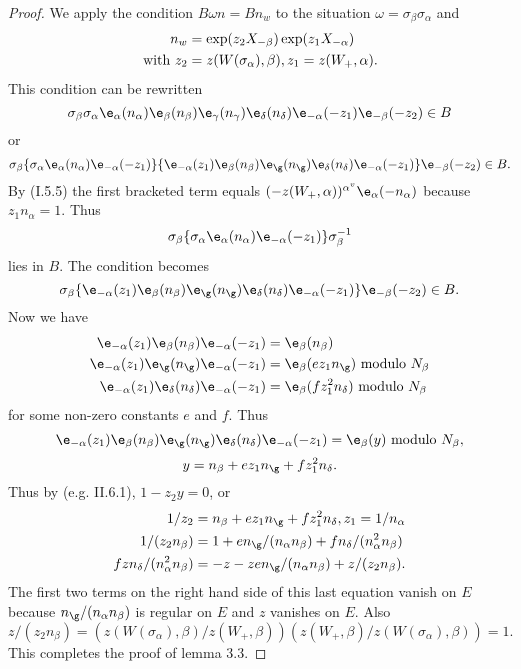 \documentclass{memo-l}
\theoremstyle{definition}
\theoremstyle{remark}
\numberwithin{section}{chapter}
\numberwithin{equation}{chapter}
\begin{document}
\begin{proof}    We apply the condition $B{\omega}n = Bn_{w}$ to the situation
${\omega} = {\sigma}_{\beta}{\sigma}_{\alpha}$ and
$$
\aligned
n_{w} &= \exp(z_{2}X_{-{\beta}})\exp(z_{1}X_{-{\alpha}}) \\
{\text{with}}\ z_{2} &= z(W({\sigma}_{\alpha}),{\beta}),
z_{1} = z(W_{+},{\alpha}).
\endaligned
$$
This condition can be rewritten
$$
{\sigma}_{\beta}{\sigma}_{\alpha}{\e}_{\alpha}(n_{\alpha})
{\e_\beta}(n_\beta)\e_\gamma(n_\gamma)\e_\delta(n_\delta)\e_{-\alpha}
(-z_{1}){\e}_{-{\beta}}(-z_{2}) \in B
$$
or
$$
\sigma_\beta
\{       \sigma_\alpha\e_\alpha(n_\alpha) \e_{-\alpha}(-z_{1})  \}
\{       \e_{-\alpha}(z_1)\e_\beta (n_\beta){\e}_\g(n_\g)\e_\delta (n_\delta)\e_{-\alpha}(-z_1)   \}
\e_{-\beta}(-z_2)
\in B .
$$
By (I.5.5) the first bracketed term equals $(-z(W_{+},{\alpha}))^{\alpha^v}
{\e}_{\alpha}(-n_{\alpha})$ because
$z_{1}n_{\alpha} = 1$.
 Thus $${\sigma}_{\beta}\{{\sigma}_{\alpha}{\e}_{\alpha}
(n_{\alpha}){\e}_{-{\alpha}}(-z_{1})\}{\sigma}_{\beta}^{-1}$$ lies
in $B$.
 The condition becomes
$$
{\sigma}_{\beta}\{{\e}_{-{\alpha}}(z_{1}){\e}_{\beta}
(n_{\beta}){\e}_{{\g}}(n_{{\g}}){\e}_{{\delta}}
(n_{{\delta}}){\e}_{{-\alpha}}(-z_{1})\}{\e}_{-{\beta}}(-z_{2})
\in B.
$$
 Now we have
$$
\aligned
{\e}_{-{\alpha}}(z_{1}){\e}_{\beta}(n_{\beta})
{\e}_{-{\alpha}}(-z_{1}) &= {\e}_{\beta}(n_{\beta})\\
{\e}_{-{\alpha}}(z_{1}){\e}_{{\g}}(n_{{\g}})
{\e}_{-{\alpha}}(-z_{1}) &= {\e}_{\beta}(ez_{1}n_{{\g}})\
{\text{modulo}}\ N_{\beta} \\
{\e}_{-{\alpha}}(z_{1}){\e}_{{\delta}}(n_{{\delta}})
{\e}_{-{\alpha}}(-z_{1}) &= {\e}_{\beta}(fz_{1}^{2}n_{{\delta}})\
{\text{modulo}}\  N_{\beta}
\endaligned
$$
for some non-zero constants $e$ and $f$.  Thus
$$
{\e}_{-{\alpha}}(z_{1}){\e}_{\beta}(n_{\beta})
{\e}_{{\g}}(n_\g)\e_\delta(n_\delta)\e_{-\alpha}(-z_{1}) = {\e}_{\beta}(y)\
{\text{modulo}}\  N_{\beta} ,
$$
$$
y = n_{\beta} + ez_{1}n_{{\g}} + fz_{1}^{2}n_{{\delta}}.
$$
Thus by (e.g. II.6.1), $1-z_{2}y = 0$, or
$$
\aligned
1/z_{2} &= n_{\beta} + ez_{1}n_{{\g}} + fz_{1}^{2}n_{{\delta}},
z_{1}=1/n_{\alpha} \\
1/(z_{2}n_{\beta}) &= 1 + en_{{\g}}/(n_{\alpha}n_{\beta}) +
fn_{{\delta}}/(n_{\alpha}^{2}n_{\beta}) \\
fzn_{{\delta}}/(n_{\alpha}^{2}n_{\beta}) &= -z -
zen_{{\g}}/(n_{\alpha}n_{\beta}) + z/(z_{2}n_{\beta}) .
\endaligned
$$
The first two terms on the right hand side of this last equation vanish on
$E$ because $n_{{\g}}/(n_{\alpha}n_{\beta})$ is regular on $E$ and
$z$ vanishes on $E$.
 Also
$$
z/(z_{2}n_{\beta}) = (z(W({\sigma}_{\alpha}),
{\beta})/z(W_{+},{\beta}))(z(W_{+},{\beta})/z(W({\sigma}_{\alpha}),
{\beta})) = 1.
$$
 This completes the proof of lemma 3.3.
\end{proof}
\end{document}
